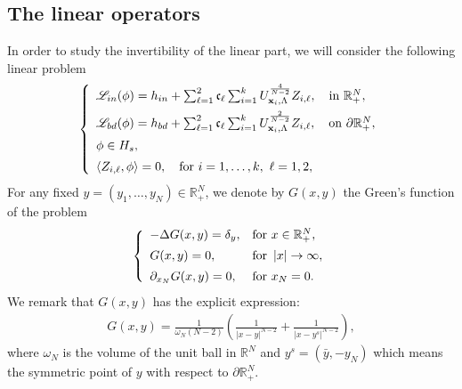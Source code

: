 \documentclass[11pt,a4paper]{amsart}
\begin{document}
\subsection{The linear operators}
In order to study the invertibility of the linear part, we will consider the following linear problem
\begin{align}\label{eq.intermediate_linearized_form}
  \left\{\begin{array}{l}
 \mathscr L_{in}(\phi)    = h_{in} + \sum_{\ell=1}^{2} \mathfrak c_{\ell}\sum_{i=1}^{k} U_{\mathbf{x}_i,\Lambda}^{\frac{4}{N-2}}Z_{i,\ell}, \quad \text{in}~\mathbb{R}_{+}^{N},\vspace{5pt}\\
    \mathscr L_{bd}(\phi) = h_{bd} + \sum_{\ell=1}^{2} \mathfrak c_{\ell}\sum_{i=1}^{k} U_{\mathbf{x}_i,\Lambda}^{\frac{2}{N-2}}Z_{i,\ell}, \quad \text{on}~ \partial\mathbb{R}_{+}^{N},\vspace{5pt}\\
    \phi \in H_s,\vspace{5pt}\\
    {\left\langle Z_{i,\ell},\phi \right\rangle} = 0,  \quad \text{for}~ i=1,\ldots,k, ~ \ell = 1,2,
  \end{array}\right.
\end{align}
For any fixed $y = \left(y_1,\ldots, y_N \right) \in \mathbb{R}_{+}^{N} $, we denote by $G(x,y)$ the Green's function of the problem
\begin{align}
  \left\{\begin{array}{ll}  
  -\Delta G(x,y) = \delta_y,&\text{for } x \in \mathbb{R}_{+}^{N},\vspace{5pt}\\
  G(x,y) = 0 , &\text{for } \left|x\right| \rightarrow \infty,\vspace{5pt}\\
  \partial_{x_N}G (x,y)=0,&\text{for } x_N = 0.
  \end{array}\right.
\end{align}
We remark that $G(x,y)$ has the explicit expression:
\begin{align}\label{eq.Green_function_expression}
  G(x,y) = \frac{1}{\omega_N \left(N-2\right)}\left(\frac{1}{{\left|x-y\right|}^{N-2}} + \frac{1}{{\left|x-y^s\right|}^{N-2}}\right),
\end{align}
where $\omega_N$ is the volume of the unit ball in $\mathbb{R}^N$ and $y^s=\left(\bar{y},-y_N\right)$ which means the symmetric point of $y$ with respect to $\partial\mathbb{R}_{+}^{N}$.
\end{document}
